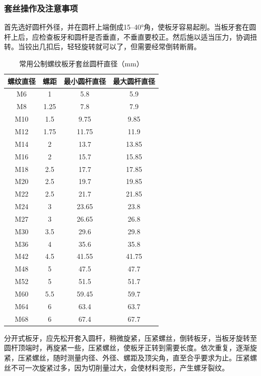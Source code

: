 \documentclass{ctexbook}
\begin{document}
\subsubsection{套丝操作及注意事项}
首先选好圆杆外径，并在圆杆上端倒成15--40°角，使板牙容易起削。当板牙套在圆杆上后，应检查板牙和圆杆是否垂直，不垂直要校正。然后施以适当压力，协调扭转。当铰出几扣后，轻轻旋转就可以了，但需要经常倒转断屑。
\begin{table}[htbp]
	\centering
	\caption{常用公制螺纹板牙套丝圆杆直径（mm）}
	\begin{tabular}{c|c|c|c}
		\hline
		螺纹直径  & 螺距    & 最小圆杆直径 & 最大圆杆直径 \\ \hline
		M6    & 1     & 5.8   & 5.9   \\ \hline
		M8    & 1.25  & 7.8   & 7.9   \\ \hline
		M10   & 1.5   & 9.75  & 9.85  \\ \hline
		M12   & 1.75  & 11.75 & 11.9  \\ \hline
		M14   & 2     & 13.7  & 13.85 \\ \hline
		M16   & 2     & 15.7  & 15.85 \\ \hline
		M18   & 2.5   & 17.7  & 17.85 \\ \hline
		M20   & 2.5   & 19.7  & 19.85 \\ \hline
		M22   & 2.5   & 21.7  & 21.85 \\ \hline
		M24   & 3     & 23.65 & 23.8  \\ \hline
		M27   & 3     & 26.65 & 26.8  \\ \hline
		M30   & 3.5   & 29.6  & 29.8  \\ \hline
		M36   & 4     & 35.6  & 35.8  \\ \hline
		M42   & 4.5   & 41.55 & 41.75 \\ \hline
		M48   & 5     & 47.5  & 47.7  \\ \hline
		M52   & 5     & 51.5  & 51.7  \\ \hline
		M60   & 5.5   & 59.45 & 59.7  \\ \hline
		M64   & 6     & 63.4  & 63.7  \\ \hline
		M68   & 6     & 67.4  & 67.7  \\ \hline
	\end{tabular}%
	\label{tab:changyongluowen}%
\end{table}%

分开式板牙，应先松开套入圆杆，稍微旋紧，压紧螺丝，倒转板牙，当板牙旋转至圆杆顶端时，再旋紧一些，压紧螺丝，使板牙正转到需要长度。依次重复，逐渐旋紧，压紧螺丝，随时测量内径、外径、螺距及顶尖角，直至合乎要求为止。压紧螺丝不可一次旋紧过多，因为切削量过大，会使材料变形，产生螺牙裂纹。
\end{document}
